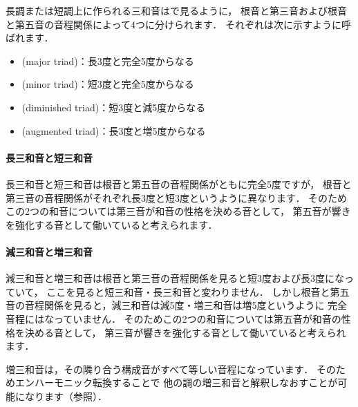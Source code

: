 \documentclass[dvipdfmx,uplatex,b5paper,openany,jbase=12Q,nomag*,textwidth-limit=44%
               ]{gachimuchi}
\begin{document}
長調または短調上に作られる三和音はで見るように，
根音と第三音および根音と第五音の音程関係によって4つに分けられます．
それぞれは次に示すように呼ばれます．
\begin{itemize}
  \item {}\xkanjispace(major triad)\xkanjispace：長3度と完全5度からなる
  \item {}\xkanjispace(minor triad)\xkanjispace：短3度と完全5度からなる
  \item {}\xkanjispace(diminished triad)\xkanjispace：短3度と減5度からなる
  \item {}\xkanjispace(augmented triad)\xkanjispace：長3度と増5度からなる
\end{itemize}

\begin{Music}[0.6\linewidth]
  \nostartrule%
  \Startpiece
  \Notes%
  \en%
  \endpiece
\end{Music}

\paragraph{長三和音と短三和音}
長三和音と短三和音は根音と第五音の音程関係がともに完全5度ですが，
根音と第三音の音程関係がそれぞれ長3度と短3度というように異なります．
そのためこの2つの和音については第三音が和音の性格を決める音として，
第五音が響きを強化する音として働いていると考えられます．

\paragraph{減三和音と増三和音}
減三和音と増三和音は根音と第三音の音程関係を見ると短3度および長3度になっていて，
ここを見ると短三和音・長三和音と変わりません．
しかし根音と第五音の音程関係を見ると，減三和音は減5度・増三和音は増5度というように
完全音程にはなっていません．
そのためこの2つの和音については第五音が和音の性格を決める音として，
第三音が響きを強化する音として働いていると考えられます．

増三和音は，その隣り合う構成音がすべて等しい音程になっています．
そのためエンハーモニック転換することで
他の調の増三和音と解釈しなおすことが可能になります（参照）．
\end{document}
